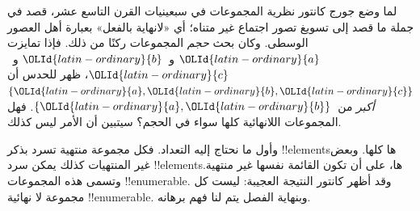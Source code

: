 \documentclass[../../../include/open-logic-section]{subfiles}
\begin{document}


لما وضع جورج كانتور نظرية المجموعات في سبعينيات القرن التاسع عشر،
قصد في جملة ما قصد إلى تسويغ تصور اجتماع غير متناه؛ أي «لانهاية
بالفعل» بعبارة أهل العصور الوسطى. وكان بحث \emph{حجم} المجموعات
ركنًا من ذلك. فإذا تمايزت ${\OLId{latin-ordinary}{a}}$ و~${\OLId{latin-ordinary}{b}}$ و~${\OLId{latin-ordinary}{c}}$، ظهر للحدس أن
$\{{\OLId{latin-ordinary}{a}}, {\OLId{latin-ordinary}{b}}, {\OLId{latin-ordinary}{c}}\}$ \emph{أكبر} من~$\{{\OLId{latin-ordinary}{a}}, {\OLId{latin-ordinary}{b}}\}$. فهل المجموعات
اللانهائية كلها سواء في الحجم؟ سيتبين أن الأمر ليس كذلك.

وأول ما نحتاج إليه التعداد. فكل مجموعة منتهية تسرد بذكر
!!{element}sها كلها. وبعض غير المنتهيات كذلك يمكن سرد
!!{element}sها، على أن تكون القائمة نفسها غير منتهية. وتسمى هذه المجموعات !!{enumerable}. وقد أظهر كانتور النتيجة العجيبة: ليست كل
مجموعة لا نهائية !!{enumerable}. وبنهاية الفصل يتم لنا فهم برهانه.
\end{document}
